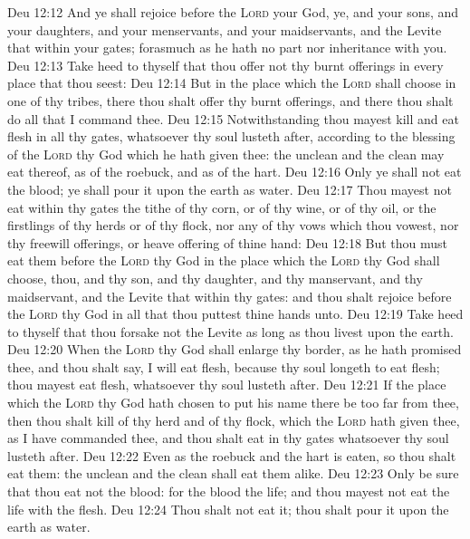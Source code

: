 \vs Deu 12:12 And ye shall rejoice before the \textsc{Lord} your God, ye, and your sons, and your daughters, and your menservants, and your maidservants, and the Levite that  within your gates; forasmuch as he hath no part nor inheritance with you.
\vs Deu 12:13 Take heed to thyself that thou offer not thy burnt offerings in every place that thou seest:
\vs Deu 12:14 But in the place which the \textsc{Lord} shall choose in one of thy tribes, there thou shalt offer thy burnt offerings, and there thou shalt do all that I command thee.
\vs Deu 12:15 Notwithstanding thou mayest kill and eat flesh in all thy gates, whatsoever thy soul lusteth after, according to the blessing of the \textsc{Lord} thy God which he hath given thee: the unclean and the clean may eat thereof, as of the roebuck, and as of the hart.
\vs Deu 12:16 Only ye shall not eat the blood; ye shall pour it upon the earth as water.
\vs Deu 12:17 Thou mayest not eat within thy gates the tithe of thy corn, or of thy wine, or of thy oil, or the firstlings of thy herds or of thy flock, nor any of thy vows which thou vowest, nor thy freewill offerings, or heave offering of thine hand:
\vs Deu 12:18 But thou must eat them before the \textsc{Lord} thy God in the place which the \textsc{Lord} thy God shall choose, thou, and thy son, and thy daughter, and thy manservant, and thy maidservant, and the Levite that  within thy gates: and thou shalt rejoice before the \textsc{Lord} thy God in all that thou puttest thine hands unto.
\vs Deu 12:19 Take heed to thyself that thou forsake not the Levite as long as thou livest upon the earth.
\vs Deu 12:20 When the \textsc{Lord} thy God shall enlarge thy border, as he hath promised thee, and thou shalt say, I will eat flesh, because thy soul longeth to eat flesh; thou mayest eat flesh, whatsoever thy soul lusteth after.
\vs Deu 12:21 If the place which the \textsc{Lord} thy God hath chosen to put his name there be too far from thee, then thou shalt kill of thy herd and of thy flock, which the \textsc{Lord} hath given thee, as I have commanded thee, and thou shalt eat in thy gates whatsoever thy soul lusteth after.
\vs Deu 12:22 Even as the roebuck and the hart is eaten, so thou shalt eat them: the unclean and the clean shall eat  them alike.
\vs Deu 12:23 Only be sure that thou eat not the blood: for the blood  the life; and thou mayest not eat the life with the flesh.
\vs Deu 12:24 Thou shalt not eat it; thou shalt pour it upon the earth as water.
